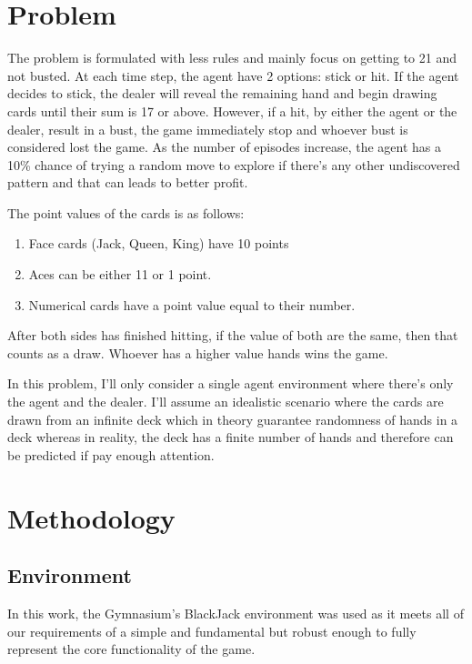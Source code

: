 \documentclass{article}
\begin{document}
\section{Problem}
The problem is formulated with less rules and mainly focus on getting
to 21 and not busted. At each time step, the agent have 2 options: stick or hit.
If the agent decides to stick, the
dealer will reveal the remaining hand and begin drawing cards until their sum is
17 or above. However, if a hit, by either the agent or the dealer, result in a bust, the game immediately stop and
whoever bust is considered lost the game. As the number of episodes increase,
the agent has a 10\% chance of trying a random move to explore if there's any
other undiscovered pattern and that can leads to better profit.

The point values of the cards is as follows:
\begin{enumerate}
	\item Face cards (Jack, Queen, King) have 10 points
	\item Aces can be either 11 or 1 point.
	\item Numerical cards have a point value equal to their number.
\end{enumerate}

After both sides has finished hitting, if the value of both are the same, then
that counts as a draw. Whoever has a higher value hands wins the game.

In this problem, I'll only consider a single agent environment where there's
only the agent and the dealer. I'll assume an idealistic scenario where the cards are drawn from an infinite
deck which in theory guarantee randomness of hands in a deck whereas in reality, the deck has a
finite number of hands and therefore can be predicted if pay enough attention.

\section{Methodology}
\subsection{Environment}
In this work, the Gymnasium's BlackJack environment was used as it meets all of
our requirements of a simple and fundamental but robust enough to fully
represent the core functionality of the game.
\end{document}
